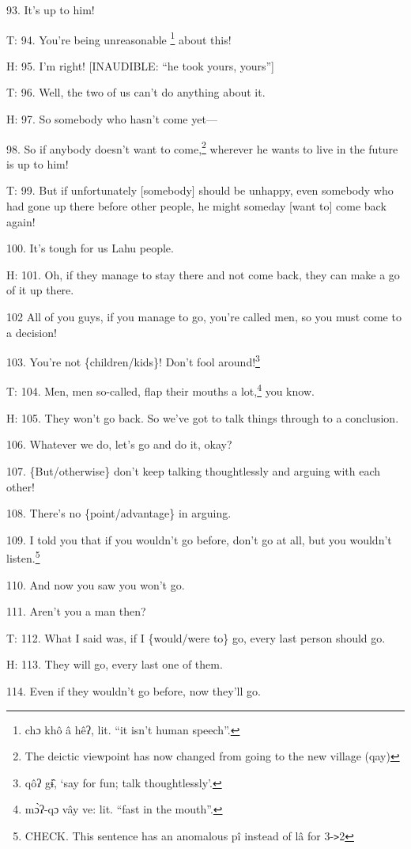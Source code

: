 93. It's up to him!

T: 94. You're being unreasonable \footnote{chɔ khô â hêʔ, lit. ``it isn't human speech''.} about this!

H: 95. I'm right! [INAUDIBLE: ``he took yours, yours'']

T: 96. Well, the two of us can't do anything about it.

H: 97. So somebody who hasn't come yet---

98. So if anybody doesn't want to come,\footnote{The deictic viewpoint has now changed from going to the new village (qay)} wherever he wants to live in the future
is up to him!

T: 99. But if unfortunately [somebody] should be unhappy, even somebody who had
gone up there before other people, he might someday [want to] come back again!

100. It's tough for us Lahu people.

H: 101. Oh, if they manage to stay there and not come back, they can make a go
of it up there.

102 All of you guys, if you manage to go, you're called men, so you must come to
a decision!

103. You're not \{children/kids\}! Don't fool around!\footnote{qôʔ gɨ̂, `say for fun; talk thoughtlessly'.}

T: 104. Men, men so-called, flap their mouths a lot,\footnote{mɔ̀ʔ-qɔ vây ve: lit. ``fast in the mouth''.} you know.

H: 105. They won't go back. So we've got to talk things through to a conclusion.

106. Whatever we do, let's go and do it, okay?

107. \{But/otherwise\} don't keep talking thoughtlessly and arguing with each other!

108. There's no \{point/advantage\} in arguing.

109. I told you that if you wouldn't go before, don't go at all, but you wouldn't
listen.\footnote{CHECK. This sentence has an anomalous pî instead of lâ for 3-\texttt{>}2}

110. And now you saw you won't go.

111. Aren't you a man then?

T: 112. What I said was, if I \{would/were to\} go, every last person should go.

H: 113. They will go, every last one of them.

114. Even if they wouldn't go before, now they'll go.


